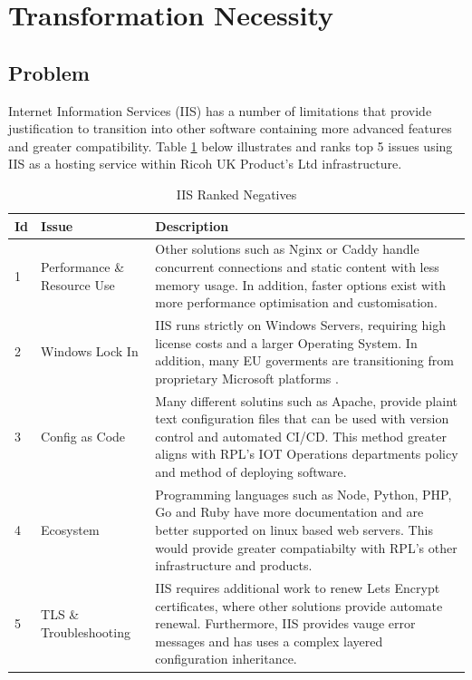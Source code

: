 \documentclass{article}
\begin{document}
\pagebreak{}
\section{Transformation Necessity}
\subsection{Problem}
Internet Information Services (IIS) has a number of limitations that provide justification to transition into other software containing more advanced features and greater compatibility. 
Table \ref{tab:iis-drawbacks} below illustrates and ranks top 5 issues using IIS as a hosting service within Ricoh UK Product's Ltd infrastructure.

\begin{table}[h!]
    \centering
    \caption{IIS Ranked Negatives}
    \label{tab:iis-drawbacks}
    \begin{tabular}{|p{0.7cm}|p{3cm}|p{10cm}|}
        \hline
        \textbf{Id} & \textbf{Issue}        & \textbf{Description}                                                                                                                                                                                                                   \\
        \hline
        1
        & Performance \& Resource Use
        & Other solutions such as Nginx or Caddy handle concurrent connections and static content with less memory usage. In addition, faster options exist with more performance optimisation and customisation. \\
        \hline
        2
        & Windows Lock In
        & IIS runs strictly on Windows Servers, requiring high license costs and a larger Operating System. In addition, many EU goverments are transitioning from proprietary Microsoft platforms \parencite{eu-microsoft-shift}. \\
        \hline
        3
        & Config as Code
        & Many different solutins such as Apache, provide plaint text configuration files that can be used with version control and automated CI/CD. This method greater aligns with RPL's IOT Operations departments policy and method of deploying software. \\
        \hline
        4
        & Ecosystem
        & Programming languages such as Node, Python, PHP, Go and Ruby have more documentation and are better supported on linux based web servers. This would provide greater compatiabilty with RPL's other infrastructure and products. \\
        \hline
        5
        & TLS \& Troubleshooting
        & IIS requires additional work to renew Lets Encrypt certificates, where other solutions provide automate renewal. Furthermore, IIS provides vauge error messages and has uses a complex layered configuration inheritance. \\
        \hline
    \end{tabular}
\end{table}
\end{document}
